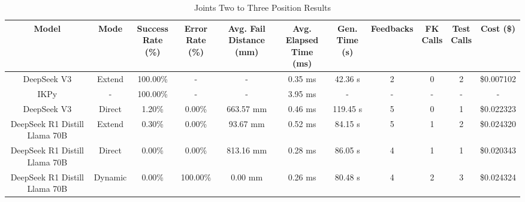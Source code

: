 \begin{landscape}
\begin{table}[H]
\tiny
\renewcommand{\arraystretch}{1.2}
\caption{Joints Two to Three Position Results}
\begin{center}
\begin{tabular}{|c|c|c|c|c|c|c|c|c|c|c|}
    \hline
    \textbf{Model} & 
    \textbf{Mode} & 
    \makecell{\textbf{Success}\\\textbf{Rate (\%)}} &
    \makecell{\textbf{Error}\\\textbf{Rate (\%)}} &
    \makecell{\textbf{Avg. Fail}\\\textbf{Distance (mm)}} &
    \makecell{\textbf{Avg. Elapsed}\\\textbf{Time (ms)}} &
    \makecell{\textbf{Gen.}\\\textbf{Time (s)}} &
    \textbf{Feedbacks} &
    \makecell{\textbf{FK}\\\textbf{Calls}} &
    \makecell{\textbf{Test}\\\textbf{Calls}} &
    \textbf{Cost (\$)} \\
    \hline
    DeepSeek V3 & Extend & 100.00\% & - & - & 0.35 ms & 42.36 s & 2 & 0 & 2 & \$0.007102 \\
    \hline
    IKPy & - & 100.00\% & - & - & 3.95 ms & - & - & - & - & - \\
    \hline
    DeepSeek V3 & Direct & 1.20\% & 0.00\% & 663.57 mm & 0.46 ms & 119.45 s & 5 & 0 & 1 & \$0.022323 \\
    \hline
    DeepSeek R1 Distill Llama 70B & Extend & 0.30\% & 0.00\% & 93.67 mm & 0.52 ms & 84.15 s & 5 & 1 & 2 & \$0.024320 \\
    \hline
    DeepSeek R1 Distill Llama 70B & Direct & 0.00\% & 0.00\% & 813.16 mm & 0.28 ms & 86.05 s & 4 & 1 & 1 & \$0.020343 \\
    \hline
    DeepSeek R1 Distill Llama 70B & Dynamic & 0.00\% & 100.00\% & 0.00 mm & 0.26 ms & 80.48 s & 4 & 2 & 3 & \$0.024324 \\
    \hline
\end{tabular}
\label{Results-Position-2-3}
\end{center}
\end{table}


\end{landscape}
